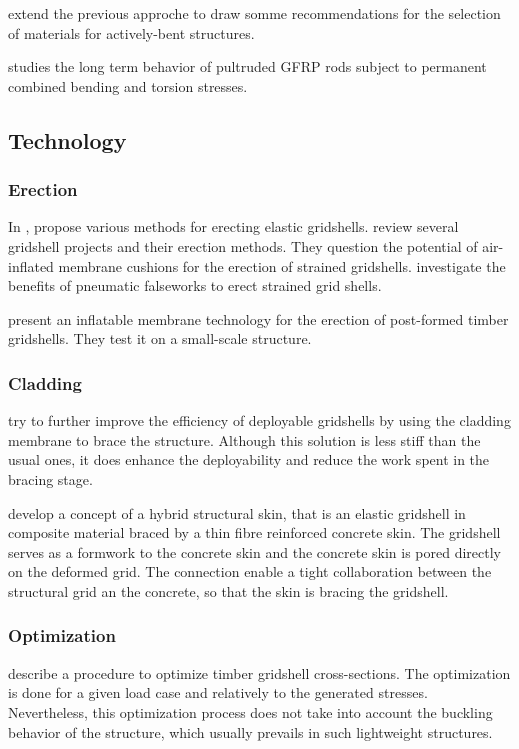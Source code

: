  extend the previous approche to draw somme recommendations for the selection of materials for actively-bent structures.

 studies the long term behavior of pultruded GFRP rods subject to permanent combined bending and torsion stresses.

\subsection{Technology}

\subsubsection{Erection}
In ,  propose various methods for erecting elastic gridshells.
 review several gridshell projects and their erection methods. They question the potential of air-inflated membrane cushions for the erection of strained gridshells.  investigate the benefits of pneumatic falseworks to erect strained grid shells.

 present an inflatable membrane technology for the erection of post-formed timber gridshells. They test it on a small-scale structure.

\subsubsection{Cladding}
 try to further improve the efficiency of deployable gridshells by using the cladding membrane to brace the structure. Although this solution is less stiff than the usual ones, it does enhance the deployability and reduce the work spent in the bracing stage.

 develop a concept of a hybrid structural skin, that is an elastic gridshell in composite material braced by a thin fibre reinforced concrete skin. The gridshell serves as a formwork to the concrete skin and the concrete skin is pored directly on the deformed grid. The connection enable a tight collaboration between the structural grid an the concrete, so that the skin is bracing the gridshell.

\subsubsection{Optimization}
 describe a procedure to optimize timber gridshell cross-sections. The  optimization is done for a given load case and relatively to the generated stresses. Nevertheless, this optimization process does not take into account the buckling behavior of the structure, which usually prevails in such lightweight structures. 


